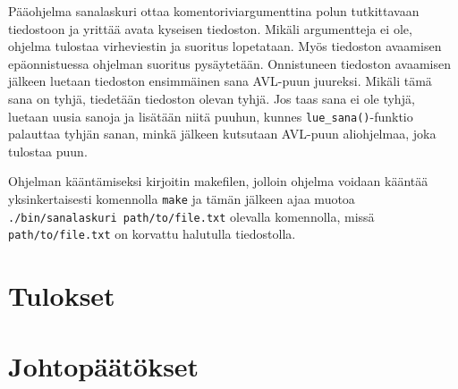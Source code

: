 \documentclass[12pt,a4paper,titlepage]{article}
\begin{document}
Pääohjelma sanalaskuri ottaa komentoriviargumenttina polun tutkittavaan tiedostoon ja yrittää avata kyseisen tiedoston. Mikäli argumentteja ei ole, ohjelma tulostaa virheviestin ja suoritus lopetataan. Myös tiedoston avaamisen epäonnistuessa ohjelman suoritus pysäytetään. Onnistuneen tiedoston avaamisen jälkeen luetaan tiedoston ensimmäinen sana AVL-puun juureksi. Mikäli tämä sana on tyhjä, tiedetään tiedoston olevan tyhjä. Jos taas sana ei ole tyhjä, luetaan uusia sanoja ja lisätään niitä puuhun, kunnes \texttt{lue\_sana()}-funktio palauttaa tyhjän sanan, minkä jälkeen kutsutaan AVL-puun aliohjelmaa, joka tulostaa puun.

Ohjelman kääntämiseksi kirjoitin makefilen, jolloin ohjelma voidaan kääntää yksinkertaisesti komennolla \texttt{make} ja tämän jälkeen ajaa muotoa \texttt{./bin/sanalaskuri path/to/file.txt} olevalla komennolla, missä \texttt{path/to/file.txt} on korvattu halutulla tiedostolla.

\section{Tulokset}



\section{Johtopäätökset}

\newpage

 
%
\end{document}
